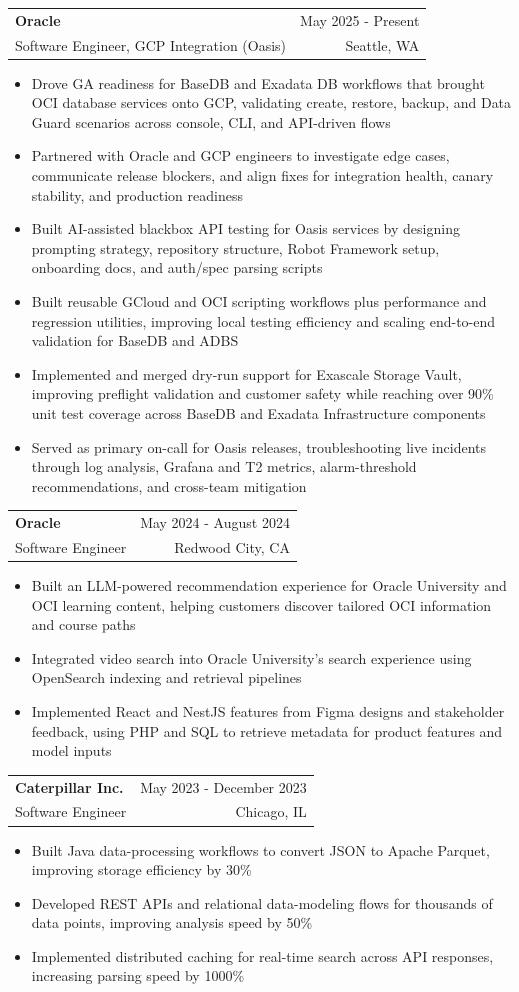 \documentclass[letterpaper,11pt]{article}
\makeatletter
\newcommand{\resumeItem}[1]{
  \item\small{
    {#1 \vspace{-1pt}}
  }
}
\newcommand{\resumeSubheading}[4]{
  \vspace{-2pt}\item
    \begin{tabular*}{0.97\textwidth}[t]{l@{\extracolsep{\fill}}r}
      \textbf{#1} & #2 \\
      {\small#3} & {\small #4} \\
    \end{tabular*}\vspace{-7pt}
}
\newcommand{\resumeItemListStart}{\begin{itemize}[leftmargin=0.18in,itemsep=1pt,topsep=2pt]}
\newcommand{\resumeItemListEnd}{\end{itemize}\vspace{-5pt}}
\makeatother
\begin{document}
    \resumeSubheading
  {Oracle}{May 2025 - Present}
  {Software Engineer, GCP Integration (Oasis)}{Seattle, WA}
  \resumeItemListStart
    \resumeItem{Drove GA readiness for BaseDB and Exadata DB workflows that brought OCI database services onto GCP, validating create, restore, backup, and Data Guard scenarios across console, CLI, and API-driven flows}
    \resumeItem{Partnered with Oracle and GCP engineers to investigate edge cases, communicate release blockers, and align fixes for integration health, canary stability, and production readiness}
    \resumeItem{Built AI-assisted blackbox API testing for Oasis services by designing prompting strategy, repository structure, Robot Framework setup, onboarding docs, and auth/spec parsing scripts}
    \resumeItem{Built reusable GCloud and OCI scripting workflows plus performance and regression utilities, improving local testing efficiency and scaling end-to-end validation for BaseDB and ADBS}
    \resumeItem{Implemented and merged dry-run support for Exascale Storage Vault, improving preflight validation and customer safety while reaching over 90\% unit test coverage across BaseDB and Exadata Infrastructure components}
    \resumeItem{Served as primary on-call for Oasis releases, troubleshooting live incidents through log analysis, Grafana and T2 metrics, alarm-threshold recommendations, and cross-team mitigation}
  \resumeItemListEnd

    \resumeSubheading
      {Oracle}{May 2024 - August 2024}
      {Software Engineer}{Redwood City, CA}
      \resumeItemListStart
        \resumeItem{Built an LLM-powered recommendation experience for Oracle University and OCI learning content, helping customers discover tailored OCI information and course paths}
        \resumeItem{Integrated video search into Oracle University's search experience using OpenSearch indexing and retrieval pipelines}
        \resumeItem{Implemented React and NestJS features from Figma designs and stakeholder feedback, using PHP and SQL to retrieve metadata for product features and model inputs}
      \resumeItemListEnd

    \resumeSubheading
      {Caterpillar Inc.}{May 2023 - December 2023}
      {Software Engineer}{Chicago, IL}
      \resumeItemListStart
        \resumeItem{Built Java data-processing workflows to convert JSON to Apache Parquet, improving storage efficiency by 30\%}
        \resumeItem{Developed REST APIs and relational data-modeling flows for thousands of data points, improving analysis speed by 50\%}
        \resumeItem{Implemented distributed caching for real-time search across API responses, increasing parsing speed by 1000\%}
      \resumeItemListEnd
\end{document}
